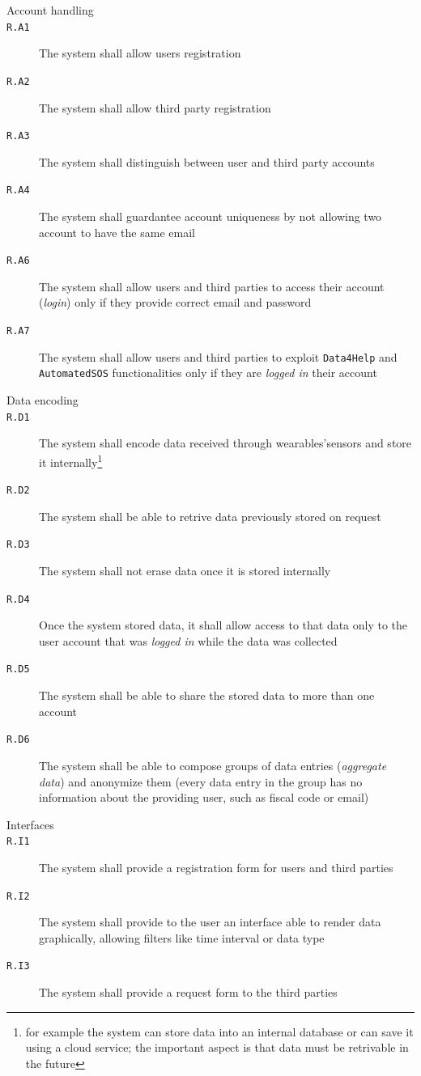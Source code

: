     \begin{description}
      \item[Account handling]
      \item[\texttt{R.A1}] The system shall allow users registration
      \item[\texttt{R.A2}] The system shall allow third party registration
      \item[\texttt{R.A3}] The system shall distinguish between user and third party accounts
      \item[\texttt{R.A4}] The system shall guardantee account uniqueness by not allowing two account to have the same email
      \item[\texttt{R.A6}] The system shall allow users and third parties to access their account (\textit{login}) only if they provide correct email and password
      \item[\texttt{R.A7}] The system shall allow users and third parties to exploit \texttt{Data4Help} and \texttt{AutomatedSOS} functionalities only if they are \textit{logged in} their account

      \item[Data encoding]
      \item[\texttt{R.D1}] The system shall encode data received through wearables'sensors and store it internally\footnote{for example the system can store data into an internal database or can save it using a cloud service; the important aspect is that data must be retrivable in the future}
      \item[\texttt{R.D2}] The system shall be able to retrive data previously stored on request
      \item[\texttt{R.D3}] The system shall not erase data once it is stored internally
      \item[\texttt{R.D4}] Once the system stored data, it shall allow access to that data only to the user account that was \textit{logged in} while the data was collected
      \item[\texttt{R.D5}] The system shall be able to share the stored data to more than one account
      \item[\texttt{R.D6}] The system shall be able to compose groups of data entries (\textit{aggregate data}) and anonymize them (every data entry in the group has no information about the providing user, such as fiscal code or email)

      \item[Interfaces]
      \item[\texttt{R.I1}] The system shall provide a registration form for users and third parties
      \item[\texttt{R.I2}] The system shall provide to the user an interface able to render data graphically, allowing filters like time interval or data type
      \item[\texttt{R.I3}] The system shall provide a request form to the third parties


\end{description}

